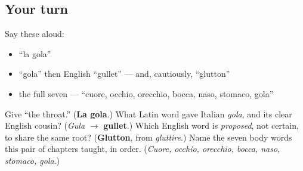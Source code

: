 \subsection*{Your turn}
Say these aloud:

\begin{itemize}
\raggedright
  \item \textquotedblleft{}la gola\textquotedblright{}
  \item \textquotedblleft{}gola\textquotedblright{} then English \textquotedblleft{}gullet\textquotedblright{} — and, cautiously, \textquotedblleft{}glutton\textquotedblright{}
  \item the full seven — \textquotedblleft{}cuore, occhio, orecchio, bocca, naso, stomaco, gola\textquotedblright{}
\end{itemize}

\begin{tcolorbox}[breakable,colback=teal!4,colframe=teal!35!black,title={Before you move on}]
Give \textquotedblleft{}the throat.\textquotedblright{} (\textbf{La gola}.) What Latin word gave Italian \emph{gola}, and its clear English cousin? (\emph{Gula} $\to$ \textbf{gullet}.) Which English word is \emph{proposed}, not certain, to share the same root? (\textbf{Glutton}, from \emph{gluttire}.) Name the seven body words this pair of chapters taught, in order. (\emph{Cuore, occhio, orecchio, bocca, naso, stomaco, gola}.)
\end{tcolorbox}

